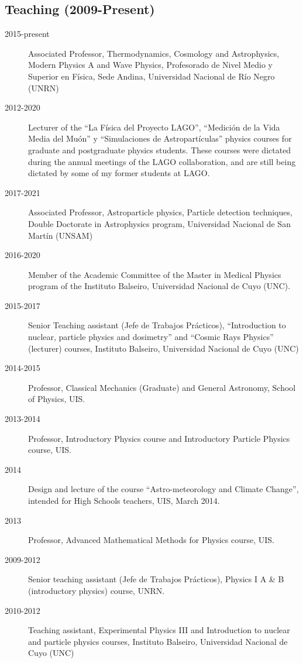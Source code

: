 \subsection*{Teaching (2009-Present)}
\begin{description}
	\item[2015-present] Associated Professor, Thermodynamics, Cosmology and Astrophysics, Modern Physics A and Wave Physics, Profesorado de Nivel Medio y Superior en Física, Sede Andina, Universidad Nacional de Río Negro (UNRN)
	\item [2012-2020] Lecturer of the ``La Física del Proyecto LAGO'', ``Medición de la Vida Media del Muón'' y ``Simulaciones de Astropartículas'' physics courses for graduate and postgraduate physics students.
	These courses were dictated during the annual meetings of the LAGO collaboration, and are still being dictated by some of my former students at LAGO\@.
	\item[2017-2021] Associated Professor, Astroparticle physics, Particle detection techniques, Double Doctorate in Astrophysics program, Universidad Nacional de San Martín (UNSAM)
	\item[2016-2020] Member of the Academic Committee of the Master in Medical Physics program of the Instituto Balseiro, Universidad Nacional de Cuyo (UNC).
	\item[2015-2017] Senior Teaching assistant (Jefe de Trabajos Prácticos), ``Introduction to nuclear, particle physics and dosimetry'' and ``Cosmic Rays Physics'' (lecturer) courses, Instituto Balseiro, Universidad Nacional de Cuyo (UNC)
	\item[2014-2015] Professor, Classical Mechanics (Graduate) and General Astronomy, School of Physics, UIS\@.
	\item[2013-2014] Professor, Introductory Physics course and Introductory Particle Physics course, UIS\@.
	\item[2014] Design and lecture of the course ``Astro-meteorology and Climate Change'', intended for High Schools teachers, UIS, March 2014.
	\item[2013] Professor, Advanced Mathematical Methods for Physics course, UIS\@.
	\item[2009-2012] Senior teaching assistant (Jefe de Trabajos Prácticos), Physics I A \& B (introductory physics) course, UNRN\@.
	\item[2010-2012] Teaching assistant, Experimental Physics III and Introduction to nuclear and particle physics courses, Instituto Balseiro, Universidad Nacional de Cuyo (UNC)
\end{description}
\else
